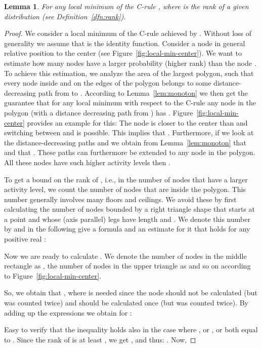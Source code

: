 \documentclass[conference]{IEEEtran}
\newtheorem{lemma}{Lemma}
\begin{document}
\begin{lemma}\label{lemma:c-rule-upper}
For any local minimum of the C-rule , where  is the rank of a given distribution (see Definition~\ref{dfn:rank}). 
\end{lemma}
\begin{proof}
We consider a local minimum of the C-rule achieved by . Without loss of generality we assume that  is the identity function. Consider a node  in general relative position to the center  (see Figure~\ref{fig:local-min-center}). We want to estimate how many nodes have a larger probability (higher rank) than the node . To achieve this estimation, we analyze the area of the largest polygon, such that every node inside and on the edges of the polygon belongs to some distance-decreasing path from  to . According to Lemma~\ref{lem:monoton} we then get the guarantee that for any local minimum with respect to the C-rule any node  in the polygon (with a distance decreasing path from ) has . Figure~\ref{fig:local-min-center} provides an example for this: The node  is closer to the center than  and switching between  and  is possible. This implies that . Furthermore, if we look at the distance-decreasing paths  and  we obtain from Lemma~\ref{lem:monoton} that  and that . These paths can furthermore be extended to any node in the polygon. All these nodes have such higher activity levels then . 







To get a bound on the rank of , i.e., in the number of nodes that have a larger activity level, we count the number of nodes  that are inside the polygon. This number generally involves many floors and ceilings. We avoid these by first calculating the number of nodes  bounded by a right triangle shape that starts at a point and whose (axis parallel) legs have length  and . We denote this number by  and in the following give a formula and an estimate for it that holds for any positive real :





Now we are ready to calculate . We denote the number of nodes in the middle rectangle as , the number of nodes in the upper triangle as  and so on according to Figure~\ref{fig:local-min-center}.

So, we obtain that , where  is needed since the node  should not be calculated (but was counted twice) and  should be calculated once (but was counted twice).
By adding up the expressions we obtain for :

Easy to verify that the inequality  holds also in the case where , or , or both equal to .
Since the rank of  is at least , we get , and thus: . Now,

\end{proof}
\end{document}
